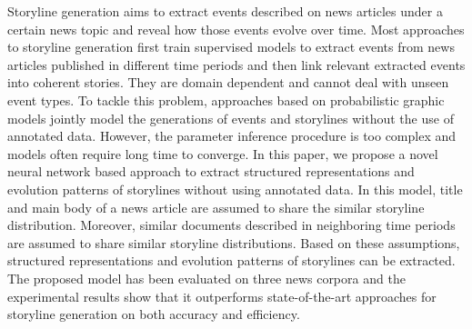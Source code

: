 Storyline generation aims to extract events described on news articles under a certain news topic and reveal how those events evolve over time. Most approaches to storyline generation first train supervised models to extract events from news articles published in different time periods and then link relevant extracted events into coherent stories. They are domain dependent and cannot deal with unseen event types. To tackle this problem, approaches based on probabilistic graphic models jointly model the generations of events and storylines without the use of annotated data. However, the parameter inference procedure is too complex and models often require long time to converge. In this paper, we propose a novel neural network based approach to extract structured representations and evolution patterns of storylines without using annotated data. In this model, title and main body of a news article are assumed to share the similar storyline distribution. Moreover, similar documents described in neighboring time periods are assumed to share similar storyline distributions. Based on these assumptions, structured representations and evolution patterns of storylines can be extracted. The proposed model has been evaluated on three news corpora and the experimental results show that it outperforms state-of-the-art approaches for storyline generation on both accuracy and efficiency.
